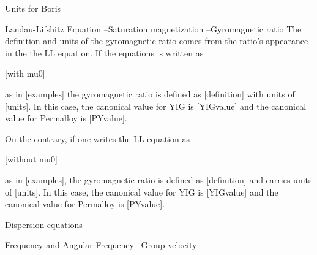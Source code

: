 Units for Boris

Landau-Lifshitz Equation
--Saturation magnetization
--Gyromagnetic ratio
The definition and units of the gyromagnetic ratio comes from the ratio's appearance in the the LL equation. If the equations is written as

[with mu0]

as in [examples] the gyromagnetic ratio is defined as [definition] with units of [units]. In this case, the canonical value for YIG is [YIGvalue] and the canonical value for Permalloy is [PYvalue].

On the contrary, if one writes the LL equation as

[without mu0]

as in [examples], the gyromagnetic ratio is defined as [definition] and carries units of [units]. In this case, the canonical value for YIG is [YIGvalue] and the canonical value for Permalloy is [PYvalue].

Dispersion equations

Frequency and Angular Frequency
--Group velocity